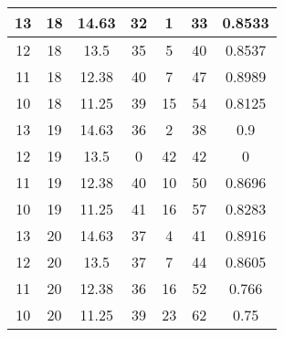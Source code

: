 \documentclass[letterpaper, 12pt]{article}
\begin{document}
\begin{longtable}{|c|c|c|c|c|c|c|}
\hline
13 & 18 & 14.63 & 32 & 1 & 33 & 0.8533 \\
\hline
12 & 18 & 13.5 & 35 & 5 & 40 & 0.8537 \\
\hline
11 & 18 & 12.38 & 40 & 7 & 47 & 0.8989 \\
\hline
10 & 18 & 11.25 & 39 & 15 & 54 & 0.8125 \\
\hline
13 & 19 & 14.63 & 36 & 2 & 38 & 0.9 \\
\hline
12 & 19 & 13.5 & 0 & 42 & 42 & 0 \\
\hline
11 & 19 & 12.38 & 40 & 10 & 50 & 0.8696 \\
\hline
10 & 19 & 11.25 & 41 & 16 & 57 & 0.8283 \\
\hline
13 & 20 & 14.63 & 37 & 4 & 41 & 0.8916 \\
\hline
12 & 20 & 13.5 & 37 & 7 & 44 & 0.8605 \\
\hline
11 & 20 & 12.38 & 36 & 16 & 52 & 0.766 \\
\hline
10 & 20 & 11.25 & 39 & 23 & 62 & 0.75 \\
\hline
\end{longtable}
\end{document}
